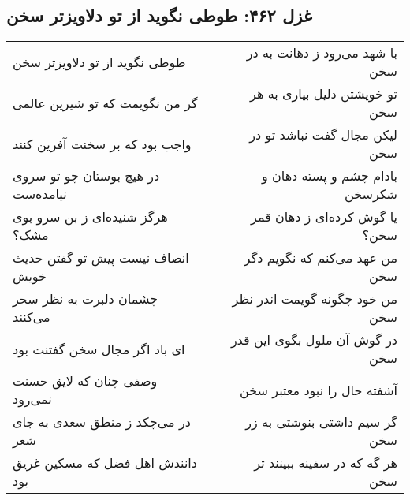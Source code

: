 \begin{center}
\section*{غزل ۴۶۲: طوطی نگوید از تو دلاویزتر سخن}
\label{sec:462}
\begin{longtable}{l p{0.5cm} r}
طوطی نگوید از تو دلاویزتر سخن
&&
با شهد می‌رود ز دهانت به در سخن
\\
گر من نگویمت که تو شیرین عالمی
&&
تو خویشتن دلیل بیاری به هر سخن
\\
واجب بود که بر سخنت آفرین کنند
&&
لیکن مجال گفت نباشد تو در سخن
\\
در هیچ بوستان چو تو سروی نیامده‌ست
&&
بادام چشم و پسته دهان و شکرسخن
\\
هرگز شنیده‌ای ز بن سرو بوی مشک؟
&&
یا گوش کرده‌ای ز دهان قمر سخن؟
\\
انصاف نیست پیش تو گفتن حدیث خویش
&&
من عهد می‌کنم که نگویم دگر سخن
\\
چشمان دلبرت به نظر سحر می‌کنند
&&
من خود چگونه گویمت اندر نظر سخن
\\
ای باد اگر مجال سخن گفتنت بود
&&
در گوش آن ملول بگوی این قدر سخن
\\
وصفی چنان که لایق حسنت نمی‌رود
&&
آشفته حال را نبود معتبر سخن
\\
در می‌چکد ز منطق سعدی به جای شعر
&&
گر سیم داشتی بنوشتی به زر سخن
\\
دانندش اهل فضل که مسکین غریق بود
&&
هر گه که در سفینه ببینند تر سخن
\\
\end{longtable}
\end{center}

